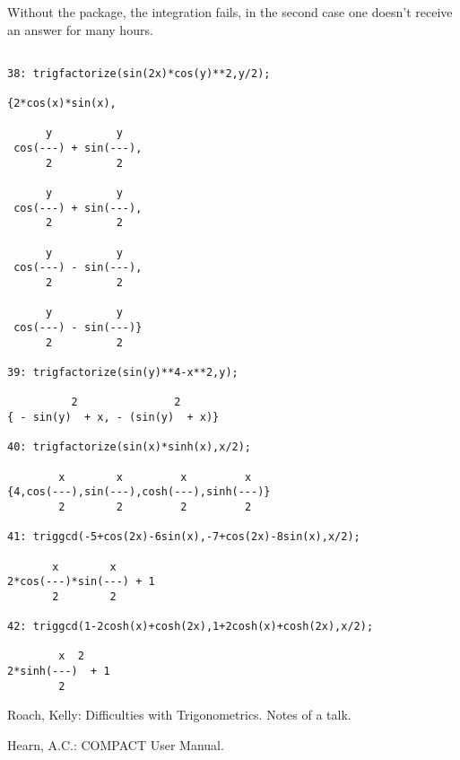 Without the package, the integration fails, in the second case one doesn't 
receive an answer for many hours.
{\small
\begin{verbatim}

38: trigfactorize(sin(2x)*cos(y)**2,y/2);

{2*cos(x)*sin(x),

      y          y
 cos(---) + sin(---),
      2          2

      y          y
 cos(---) + sin(---),
      2          2

      y          y
 cos(---) - sin(---),
      2          2

      y          y
 cos(---) - sin(---)}
      2          2

39: trigfactorize(sin(y)**4-x**2,y);

          2               2
{ - sin(y)  + x, - (sin(y)  + x)}

40: trigfactorize(sin(x)*sinh(x),x/2);

        x        x         x         x
{4,cos(---),sin(---),cosh(---),sinh(---)}
        2        2         2         2

41: triggcd(-5+cos(2x)-6sin(x),-7+cos(2x)-8sin(x),x/2);

       x        x
2*cos(---)*sin(---) + 1
       2        2

42: triggcd(1-2cosh(x)+cosh(2x),1+2cosh(x)+cosh(2x),x/2);

        x  2
2*sinh(---)  + 1
        2
\end{verbatim}
}

\begin{thebibliography}{99}

Roach, Kelly: Difficulties with Trigonometrics. Notes of a talk.

Hearn, A.C.: COMPACT User Manual. 
\end{thebibliography}

